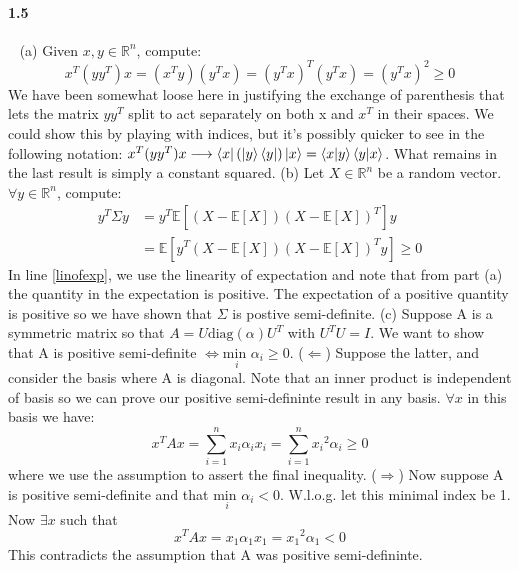 \documentclass{article}
\begin{document}
\paragraph{1.5}\ \newline
(a) Given $x,y \in \mathds{R}^n$, compute: 
\begin{equation}
  x^T (y y^T) x = ( x^T y ) ( y^T x ) = (y^T x)^T (y^T x) = (y^T x)^2 \ge 0
\end{equation}
We have been somewhat loose here in justifying the exchange of parenthesis that lets the matrix $y y^T$ split to act separately on both x and $x^T$ in their spaces. We could show this by playing with indices, but it's possibly quicker to see in the following notation: $x^T (yy^T) x \longrightarrow \bra{x}(\ket{y}\bra{y})\ket{x} = \bra{x}\ket{y}\bra{y}\ket{x} $. What remains in the last result is simply a constant squared.
\newline 
\newline
(b) Let $X \in \mathds{R}^n$ be a random vector. $\forall y \in \mathds{R}^n$, compute:
\begin{align}
    y^T \Sigma y 
    &= y^T \mathds{E}[(X-\mathds{E}[X])(X-\mathds{E}[X])^T] y \\
    &= \mathds{E} [y^T (X-\mathds{E}[X])(X-\mathds{E}[X])^T y ] \label{linofexp} \ge 0
\end{align} 
In line \ref{linofexp}, we use the linearity of expectation and note that from part (a) the quantity in the expectation is positive. The expectation of a positive quantity is positive so we have shown that $\Sigma$ is postive semi-definite.
(c) Suppose A is a symmetric matrix so that $A=U\text{diag}(\alpha)U^T$ with $U^TU=I$. We want to show that A is positive semi-definite $\Leftrightarrow \underset{i}{\text{min }}\alpha_i \ge 0$.
\newline
($\Leftarrow$) Suppose the latter, and consider the basis where A is diagonal. Note that an inner product is independent of basis so we can prove our positive semi-defininte result in any basis. $\forall x$ in this basis we have:
\begin{equation}
    x^T A x = \sum_{i=1}^{n} x_i \alpha_i x_i = \sum_{i=1}^{n} {x_i}^2 \alpha_i \ge 0
\end{equation}
where we use the assumption to assert the final inequality.
\newline
($\Rightarrow$) Now suppose A is positive semi-definite and that $\underset{i}{\text{min }}\alpha_i < 0$. W.l.o.g. let this minimal index be 1. Now $\exists x$ such that
\begin{equation}
    x^T A x = x_1 \alpha_1 x_1 = {x_1}^2 \alpha_1 < 0
\end{equation}
This contradicts the assumption that A was positive semi-defininte.
\end{document}

